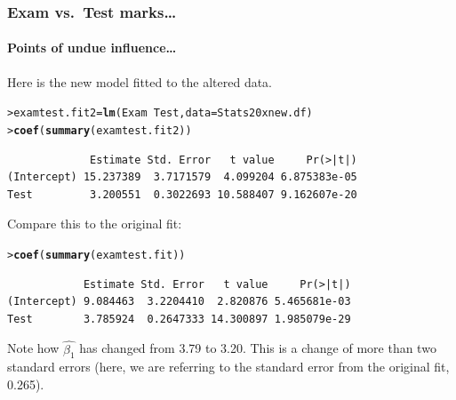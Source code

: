 \documentclass{beamer}\usepackage[]{graphicx}\usepackage[]{xcolor}
\makeatletter
\newcommand{\hlopt}[1]{\textcolor[rgb]{0,0,0}{#1}}%
\newcommand{\hlstd}[1]{\textcolor[rgb]{0.345,0.345,0.345}{#1}}%
\newcommand{\hlkwb}[1]{\textcolor[rgb]{0.69,0.353,0.396}{#1}}%
\newcommand{\hlkwc}[1]{\textcolor[rgb]{0.333,0.667,0.333}{#1}}%
\newcommand{\hlkwd}[1]{\textcolor[rgb]{0.737,0.353,0.396}{\textbf{#1}}}%
\newenvironment{kframe}{%
 \def\at@end@of@kframe{}%
 \ifinner\ifhmode%
  \def\at@end@of@kframe{\end{minipage}}%
  \begin{minipage}{\columnwidth}%
 \fi\fi%
 \def\FrameCommand##1{\hskip\@totalleftmargin \hskip-\fboxsep
 \colorbox{shadecolor}{##1}\hskip-\fboxsep
     \hskip-\linewidth \hskip-\@totalleftmargin \hskip\columnwidth}%
 \MakeFramed {\advance\hsize-\width
   \@totalleftmargin\z@ \linewidth\hsize
   \@setminipage}}%
 {\par\unskip\endMakeFramed%
 \at@end@of@kframe}
\newenvironment{knitrout}{}{} %
\makeatother
\begin{document}
\begin{frame}[fragile]
\frametitle{Exam vs.\ Test marks\ldots}
\framesubtitle{Points of undue influence\ldots}
Here is the new model fitted to the altered data.
\begin{knitrout}\scriptsize
{}\color{fgcolor}\begin{kframe}
\begin{alltt}
\hlstd{> }\hlstd{examtest.fit2}\hlkwb{=}\hlkwd{lm}\hlstd{(Exam}\hlopt{~}\hlstd{Test,} \hlkwc{data}\hlstd{=Stats20xnew.df)}
\hlstd{> }\hlkwd{coef}\hlstd{(}\hlkwd{summary}\hlstd{(examtest.fit2))}
\end{alltt}
\end{kframe}
\end{knitrout}
\begin{knitrout}\scriptsize
{}\color{fgcolor}\begin{kframe}
\begin{verbatim}
             Estimate Std. Error   t value     Pr(>|t|)
(Intercept) 15.237389  3.7171579  4.099204 6.875383e-05
Test         3.200551  0.3022693 10.588407 9.162607e-20
\end{verbatim}
\end{kframe}
\end{knitrout}
Compare this to the original fit:
\begin{knitrout}\scriptsize
{}\color{fgcolor}\begin{kframe}
\begin{alltt}
\hlstd{> }\hlkwd{coef}\hlstd{(}\hlkwd{summary}\hlstd{(examtest.fit))}
\end{alltt}
\begin{verbatim}
            Estimate Std. Error   t value     Pr(>|t|)
(Intercept) 9.084463  3.2204410  2.820876 5.465681e-03
Test        3.785924  0.2647333 14.300897 1.985079e-29
\end{verbatim}
\end{kframe}
\end{knitrout}


Note how $\hat{\beta_1}$ has changed from 3.79 to 3.20. This is a change of more than two standard errors (here, we are referring to the standard error from the original fit, 0.265).
\end{frame}
\end{document}
